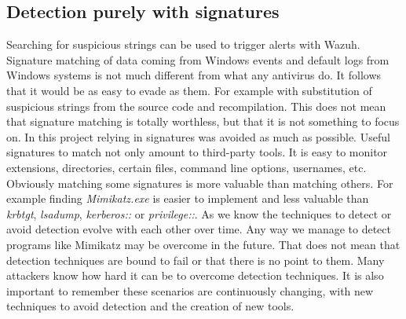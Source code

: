 \subsection{Detection purely with signatures}
Searching for suspicious strings can be used to trigger alerts with Wazuh.
Signature matching of data coming from Windows events and default logs from Windows systems is not much different from what any antivirus do. It follows that it would be as easy to evade as them. For example with substitution of suspicious strings from the source code and recompilation\cite{understanding_powersploit_mimikatz}.
\linej
\linej
This does not mean that signature matching is totally worthless, but that it is not something to focus on. In this project relying in signatures was avoided as much as possible.
Useful signatures to match not only amount to third-party tools. It is easy to monitor extensions, directories, certain files, command line options, usernames, etc.
\linej
Obviously matching some signatures is more valuable than matching others. For example finding \textit{Mimikatz.exe} is easier to implement and less valuable than \textit{krbtgt}, \textit{lsadump}, \textit{kerberos::} or \textit{privilege::}.
\linej
\linej
As we know the techniques to detect or avoid detection evolve with each other over time.
Any way we manage to detect programs like Mimikatz may be overcome in the future.
\linej
That does not mean that detection techniques are bound to fail or that there is no point to them.
Many attackers know how hard it can be to overcome detection techniques.
\linej
It is also important to remember these scenarios are continuously changing, with new techniques to avoid detection and the creation of new tools.

